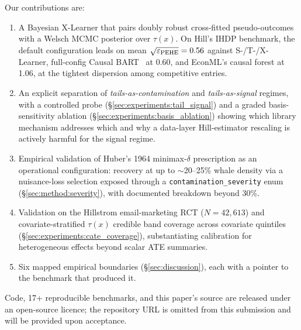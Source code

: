 Our contributions are:
\begin{enumerate}
  \item A Bayesian X-Learner that pairs doubly robust cross-fitted
    pseudo-outcomes~\citep{kennedy2020optimal} with a Welsch MCMC
    posterior over $\tau(x)$. On Hill's IHDP benchmark, the default
    configuration leads on mean $\sqrt{\varepsilon_{\mathrm{PEHE}}} = 0.56$ against S-/T-/X-
    Learner, full-config Causal BART~\citep{hill2011bayesian} at
    0.60, and EconML's causal forest at 1.06, at the tightest
    dispersion among competitive entries.
  \item An explicit separation of \emph{tails-as-contamination} and
    \emph{tails-as-signal} regimes, with a controlled probe
    (\S\ref{sec:experiments:tail_signal}) and a graded
    basis-sensitivity ablation
    (\S\ref{sec:experiments:basis_ablation}) showing which
    library mechanism addresses which and why a data-layer
    Hill-estimator rescaling is actively harmful for the signal
    regime.
  \item Empirical validation of Huber's 1964 minimax-$\delta$
    prescription as an operational configuration: recovery at up to
    $\sim$20--25\% whale density via a nuisance-loss selection
    exposed through a \texttt{contamination\_severity} enum
    (\S\ref{sec:method:severity}), with documented breakdown
    beyond 30\%.
  \item Validation on the Hillstrom email-marketing RCT
    ($N = 42{,}613$) and covariate-stratified $\tau(x)$ credible
    band coverage across covariate quintiles
    (\S\ref{sec:experiments:cate_coverage}), substantiating
    calibration for heterogeneous effects beyond scalar ATE summaries.
  \item Six mapped empirical boundaries
    (\S\ref{sec:discussion}), each with a pointer to the
    benchmark that produced it.
\end{enumerate}

Code, 17+ reproducible benchmarks, and this paper's source are
released under an open-source licence; the repository URL is omitted
from this submission and will be provided upon acceptance.

